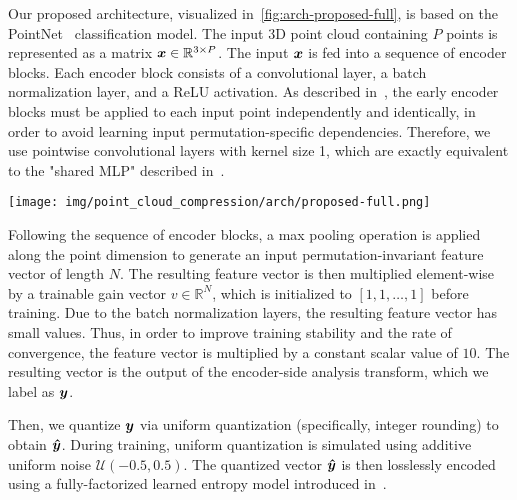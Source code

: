 Our proposed architecture, visualized in~\cref{fig:arch-proposed-full}, is based on the PointNet~\cite{qi2016pointnet} classification model.
The input 3D point cloud containing $P$ points is represented as a matrix ${\boldsymbol{x}} \in \mathbb{R}^{3 \times P}$.
The input ${\boldsymbol{x}}$ is fed into a sequence of encoder blocks.
Each encoder block consists of a convolutional layer, a batch normalization layer, and a ReLU activation.
As described in~\cite{qi2016pointnet}, the early encoder blocks must be applied to each input point independently and identically, in order to avoid learning input permutation-specific dependencies.
Therefore, we use pointwise convolutional layers with kernel size 1, which are exactly equivalent to the "shared MLP" described in~\cite{qi2016pointnet}.

\begin{figure*}[tb]
  \centering
  \texttt{[image: img/point\_cloud\_compression/arch/proposed-full.png]}
  \caption[Proposed point cloud codec architecture]{%
    Proposed codec architecture.%
  }
  \label{fig:arch-proposed-full}
\end{figure*}

Following the sequence of encoder blocks, a max pooling operation is applied along the point dimension to generate an input permutation-invariant feature vector of length $N$.
The resulting feature vector is then multiplied element-wise by a trainable gain vector $v \in \mathbb{R}^{N}$, which is initialized to $[1, 1, \ldots, 1]$ before training.
Due to the batch normalization layers, the resulting feature vector has small values.
Thus, in order to improve training stability and the rate of convergence, the feature vector is multiplied by a constant scalar value of $10$.
The resulting vector is the output of the encoder-side analysis transform, which we label as ${\boldsymbol{y}}$.


Then, we quantize ${\boldsymbol{y}}$ via uniform quantization (specifically, integer rounding) to obtain ${\boldsymbol{\hat{y}}}$.
During training, uniform quantization is simulated using additive uniform noise $\mathcal{U}(-0.5, 0.5)$.
The quantized vector ${\boldsymbol{\hat{y}}}$ is then losslessly encoded using a fully-factorized learned entropy model introduced in~\cite{balle2018variational}.

